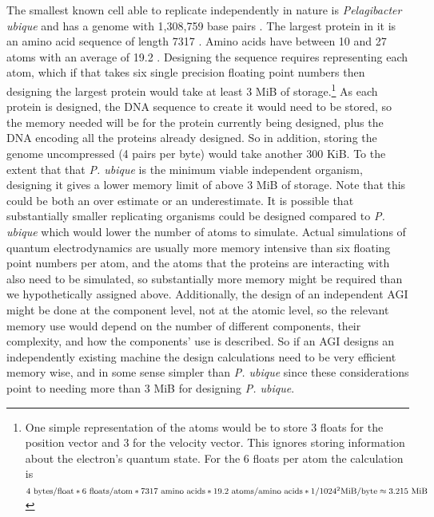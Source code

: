 \documentclass[letterpaper,twocolumn]{article}
\begin{document}

The smallest known cell able to replicate independently in nature is
{\em Pelagibacter ubique} and has a genome with 1,308,759 base pairs
\citep{Giovannoni_Science_2005}. The largest protein in it is an amino
acid sequence of length 7317 \citep{WP011282049}.  Amino acids have
between 10 and 27 atoms with an average of 19.2
\citep{aminoacidlength}.  Designing the sequence requires representing
each atom, which if that takes six single precision floating point
numbers then designing the largest protein would take at least 3 MiB of
storage.\footnote{One simple representation of the atoms would be to
store 3 floats for the position vector and 3 for the velocity
vector. This ignores storing information about the electron's quantum
state.  For the 6 floats per atom the calculation is $4 \text{
  bytes/float} * 6 \text{ floats/atom} * 7317 \text{ amino
  acids} \hspace{\stretch{1}} \\ * 19.2 \text{ atoms/amino acids} *
1/1024^2 \text{MiB/byte} \approx 3.215 \text{ MiB}$} As each protein
is designed, the DNA sequence to create it would need to be stored, so
the memory needed will be for the protein currently being designed,
plus the DNA encoding all the proteins already designed.  So in
addition, storing the genome uncompressed (4 pairs per byte) would
take another 300 KiB. To the extent that that {\em P. ubique} is the
minimum viable independent organism, designing it gives a lower memory
limit of above 3 MiB of storage. Note that this could be both an over
estimate or an underestimate.  It is possible that substantially
smaller replicating organisms could be designed compared to {\em
  P. ubique} which would lower the number of atoms to simulate. Actual
simulations of quantum electrodynamics are usually more memory
intensive than six floating point numbers per atom, and the atoms that
the proteins are interacting with also need to be simulated, so
substantially more memory might be required than we hypothetically
assigned above. Additionally, the design of an independent AGI might
be done at the component level, not at the atomic level, so the
relevant memory use would depend on the number of different
components, their complexity, and how the components' use is
described.  So if an AGI designs an independently existing machine the
design calculations need to be very efficient memory wise, and in some
sense simpler than {\em P. ubique} since these considerations point to
needing more than 3 MiB for designing {\em P. ubique}.
\end{document}
